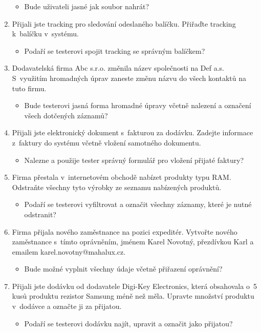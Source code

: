 \documentclass[thesis=B,czech]{FITthesis}[2012/06/26]
\begin{document}
\begin{enumerate}
		\begin{itemize}
			\item Bude uživateli jasné jak soubor nahrát?
		\end{itemize}
		\item Přijali jste tracking pro sledování odeslaného balíčku. Přiřaďte tracking k~balíčku v~systému.
		\begin{itemize}
			\item Podaří se testerovi spojit tracking se správným balíčkem?
		\end{itemize}
		\item Dodavatelská firma Abc s.r.o. změnila název společnosti na Def a.s. S~využitím hromadných úprav zaneste změnu názvu do všech kontaktů na tuto firmu.
		\begin{itemize}
			\item Bude testerovi jasná forma hromadné úpravy včetně nalezení a označení všech dotčených záznamů?
		\end{itemize}
		\item Přijali jste elektronický dokument s~fakturou za dodávku. Zadejte informace z~faktury do systému včetně vložení samotného dokumentu.
		\begin{itemize}
			\item Nalezne a použije tester správný formulář pro vložení přijaté faktury?
		\end{itemize}
		\item Firma přestala v~internetovém obchodě nabízet produkty typu RAM. Odstraňte všechny tyto výrobky ze seznamu nabízených produktů.
		\begin{itemize}
			\item Podaří se testerovi vyfiltrovat a označit všechny záznamy, které je nutné odstranit?
		\end{itemize}
		\item Firma přijala nového zaměstnance na pozici expeditér. Vytvořte nového zaměstnance s~tímto oprávněním, jménem Karel Novotný, přezdívkou Karl a emailem karel.novotny@mahalux.cz.
		\begin{itemize}
			\item Bude možné vyplnit všechny údaje včetně přiřazení oprávnění? 
		\end{itemize}
		\item Přijali jste dodávku od dodavatele Digi-Key Electronics, která obsahovala o~5 kusů produktu rezistor Samsung méně než měla. Upravte množství produktu v~dodávce a označte ji za přijatou.
		\begin{itemize}
			\item Podaří se testerovi dodávku najít, upravit a označit jako přijatou?
		\end{itemize}
	\end{enumerate}
\end{document}
